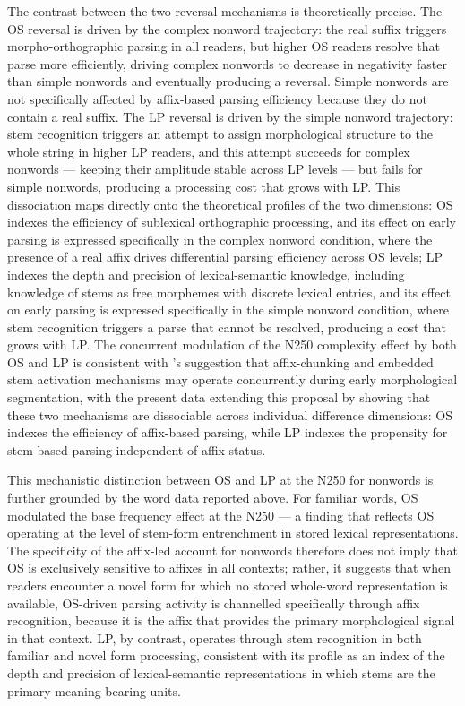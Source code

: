 \documentclass[utf8]{FrontiersinHarvard} %
\begin{document}
	The contrast between the two reversal mechanisms is theoretically precise. The OS reversal is driven by the complex nonword trajectory: the real suffix triggers morpho-orthographic parsing in all readers, but higher OS readers resolve that parse more efficiently, driving complex nonwords to decrease in negativity faster than simple nonwords and eventually producing a reversal. Simple nonwords are not specifically affected by affix-based parsing efficiency because they do not contain a real suffix. The LP reversal is driven by the simple nonword trajectory: stem recognition triggers an attempt to assign morphological structure to the whole string in higher LP readers, and this attempt succeeds for complex nonwords --- keeping their amplitude stable across LP levels --- but fails for simple nonwords, producing a processing cost that grows with LP. This dissociation maps directly onto the theoretical profiles of the two dimensions: OS indexes the efficiency of sublexical orthographic processing, and its effect on early parsing is expressed specifically in the complex nonword condition, where the presence of a real affix drives differential parsing efficiency across OS levels; LP indexes the depth and precision of lexical-semantic knowledge, including knowledge of stems as free morphemes with discrete lexical entries, and its effect on early parsing is expressed specifically in the simple nonword condition, where stem recognition triggers a parse that cannot be resolved, producing a cost that grows with LP. The concurrent modulation of the N250 complexity effect by both OS and LP is consistent with \citet{beyersmann2016}'s suggestion that affix-chunking and embedded stem activation mechanisms may operate concurrently during early morphological segmentation, with the present data extending this proposal by showing that these two mechanisms are dissociable across individual difference dimensions: OS indexes the efficiency of affix-based parsing, while LP indexes the propensity for stem-based parsing independent of affix status.
	
	This mechanistic distinction between OS and LP at the N250 for nonwords is further grounded by the word data reported above. For familiar words, OS modulated the base frequency effect at the N250 --- a finding that reflects OS operating at the level of stem-form entrenchment in stored lexical representations. The specificity of the affix-led account for nonwords therefore does not imply that OS is exclusively sensitive to affixes in all contexts; rather, it suggests that when readers encounter a novel form for which no stored whole-word representation is available, OS-driven parsing activity is channelled specifically through affix recognition, because it is the affix that provides the primary morphological signal in that context. LP, by contrast, operates through stem recognition in both familiar and novel form processing, consistent with its profile as an index of the depth and precision of lexical-semantic representations in which stems are the primary meaning-bearing units.
	
\end{document}
